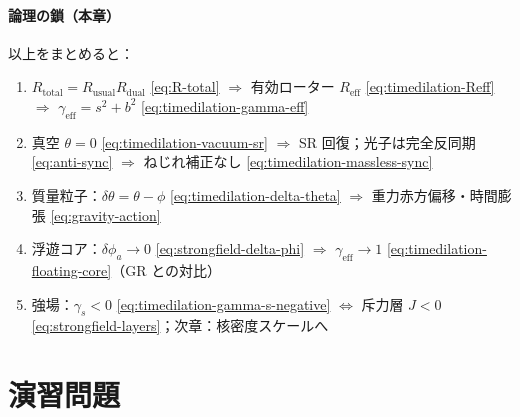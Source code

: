 \documentclass[dvipdfmx,a4paper,oneside]{jsbook}
\numberwithin{equation}{chapter}
\begin{document}
\paragraph{論理の鎖（本章）}
以上をまとめると：
\begin{enumerate}[leftmargin=2em]
  \item \(R_{\mathrm{total}} = R_{\mathrm{usual}} R_{\mathrm{dual}}\) \eqref{eq:R-total} \(\Rightarrow\) 有効ローター \(R_{\mathrm{eff}}\) \eqref{eq:timedilation-Reff} \(\Rightarrow\) \(\gamma_{\mathrm{eff}} = s^2 + b^2\) \eqref{eq:timedilation-gamma-eff}
  \item 真空 \(\theta = 0\) \eqref{eq:timedilation-vacuum-sr} \(\Rightarrow\) SR 回復；光子は完全反同期 \eqref{eq:anti-sync} \(\Rightarrow\) ねじれ補正なし \eqref{eq:timedilation-massless-sync}
  \item 質量粒子：\(\delta\theta = \theta - \phi\) \eqref{eq:timedilation-delta-theta} \(\Rightarrow\) 重力赤方偏移・時間膨張 \eqref{eq:gravity-action}
  \item 浮遊コア：\(\delta\phi_a \to 0\) \eqref{eq:strongfield-delta-phi} \(\Rightarrow\) \(\gamma_{\mathrm{eff}} \to 1\) \eqref{eq:timedilation-floating-core}（GR との対比）
  \item 強場：\(\gamma_s < 0\) \eqref{eq:timedilation-gamma-s-negative} \(\Leftrightarrow\) 斥力層 \(J < 0\) \eqref{eq:strongfield-layers}；次章：核密度スケールへ
\end{enumerate}

\section*{演習問題}
\end{document}
